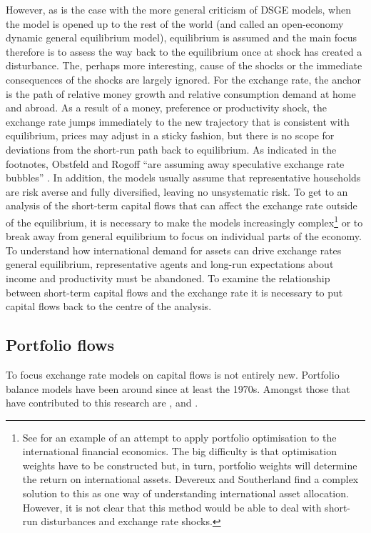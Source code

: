 \documentclass[12pt, a4paper, oneside]{article}\usepackage[]{graphicx}\usepackage[]{color}
\begin{document}
However, as is the case with the more general criticism of DSGE models, when the model is opened up to the rest of the world (and called an open-economy dynamic general equilibrium model), equilibrium is assumed and the main focus therefore is to assess the way back to the equilibrium once at shock has created a disturbance.  The, perhaps more interesting, cause of the shocks or the immediate consequences of the shocks are largely ignored.  For the exchange rate, the anchor is the path of relative money growth and relative consumption demand at home and abroad.  As a result of a money, preference or productivity shock, the exchange rate jumps immediately to the new trajectory that is consistent with equilibrium, prices may adjust in a sticky fashion, but there is no scope for deviations from the short-run path back to equilibrium.  As indicated in the footnotes, Obstfeld and Rogoff ``are assuming away speculative exchange rate bubbles'' \citep[p 640]{Obstfeld1995Redux}.  In addition, the models usually assume that representative households are risk averse and fully diversified, leaving no unsystematic risk.  To get to an analysis of the short-term capital flows that can affect the exchange rate outside of the equilibrium, it is necessary to make the models increasingly complex\footnote{See \citep{Devereux2011Portfolio} for an example of an attempt to apply portfolio optimisation to the international financial economics.  The big difficulty is that optimisation weights have to be constructed but, in turn, portfolio weights will determine the return on international assets.  Devereux and Southerland find a complex solution to this as one way of understanding international asset allocation.  However, it is not clear that this method would be able to deal with short-run disturbances and exchange rate shocks.} %
or to break away from general equilibrium to focus on individual parts of the economy.  To understand how international demand for assets can drive exchange rates general equilibrium, representative agents and long-run expectations about income and productivity must be abandoned. To examine the relationship between short-term capital flows and the exchange rate it is necessary to put capital flows back to the centre of the analysis. 
 
\subsection{Portfolio flows}
To focus exchange rate models on capital flows is not entirely new.  Portfolio balance models have been around since at least the 1970s.  Amongst those that have contributed to this research are \citep{Kouri1974International} \citep{Kouri1977}, and \citep{Branson1985International}.  %
\end{document}
